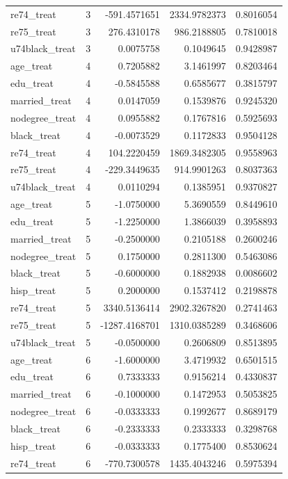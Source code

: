 \documentclass[
]{article}
\begin{document}
\begin{enumerate}
\begin{longtable}[]{@{}lrrrr@{}}
  re74\_treat & 3 & -591.4571651 & 2334.9782373 & 0.8016054 \\
  re75\_treat & 3 & 276.4310178 & 986.2188805 & 0.7810018 \\
  u74black\_treat & 3 & 0.0075758 & 0.1049645 & 0.9428987 \\
  age\_treat & 4 & 0.7205882 & 3.1461997 & 0.8203464 \\
  edu\_treat & 4 & -0.5845588 & 0.6585677 & 0.3815797 \\
  married\_treat & 4 & 0.0147059 & 0.1539876 & 0.9245320 \\
  nodegree\_treat & 4 & 0.0955882 & 0.1767816 & 0.5925693 \\
  black\_treat & 4 & -0.0073529 & 0.1172833 & 0.9504128 \\
  re74\_treat & 4 & 104.2220459 & 1869.3482305 & 0.9558963 \\
  re75\_treat & 4 & -229.3449635 & 914.9901263 & 0.8037363 \\
  u74black\_treat & 4 & 0.0110294 & 0.1385951 & 0.9370827 \\
  age\_treat & 5 & -1.0750000 & 5.3690559 & 0.8449610 \\
  edu\_treat & 5 & -1.2250000 & 1.3866039 & 0.3958893 \\
  married\_treat & 5 & -0.2500000 & 0.2105188 & 0.2600246 \\
  nodegree\_treat & 5 & 0.1750000 & 0.2811300 & 0.5463086 \\
  black\_treat & 5 & -0.6000000 & 0.1882938 & 0.0086602 \\
  hisp\_treat & 5 & 0.2000000 & 0.1537412 & 0.2198878 \\
  re74\_treat & 5 & 3340.5136414 & 2902.3267820 & 0.2741463 \\
  re75\_treat & 5 & -1287.4168701 & 1310.0385289 & 0.3468606 \\
  u74black\_treat & 5 & -0.0500000 & 0.2606809 & 0.8513895 \\
  age\_treat & 6 & -1.6000000 & 3.4719932 & 0.6501515 \\
  edu\_treat & 6 & 0.7333333 & 0.9156214 & 0.4330837 \\
  married\_treat & 6 & -0.1000000 & 0.1472953 & 0.5053825 \\
  nodegree\_treat & 6 & -0.0333333 & 0.1992677 & 0.8689179 \\
  black\_treat & 6 & -0.2333333 & 0.2333333 & 0.3298768 \\
  hisp\_treat & 6 & -0.0333333 & 0.1775400 & 0.8530624 \\
  re74\_treat & 6 & -770.7300578 & 1435.4043246 & 0.5975394 \\

\end{longtable}
\end{enumerate}
\end{document}
